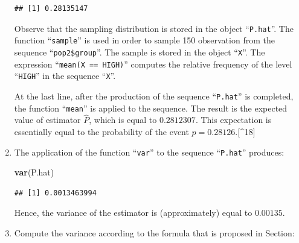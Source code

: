 \documentclass[]{krantz}
\makeatletter
\newenvironment{Shaded}{\begin{snugshade}}{\end{snugshade}}
\newcommand{\KeywordTok}[1]{\textcolor[rgb]{0.13,0.29,0.53}{\textbf{#1}}}
\newcommand{\DecValTok}[1]{\textcolor[rgb]{0.00,0.00,0.81}{#1}}
\newcommand{\StringTok}[1]{\textcolor[rgb]{0.31,0.60,0.02}{#1}}
\newcommand{\ControlFlowTok}[1]{\textcolor[rgb]{0.13,0.29,0.53}{\textbf{#1}}}
\newcommand{\OperatorTok}[1]{\textcolor[rgb]{0.81,0.36,0.00}{\textbf{#1}}}
\newcommand{\NormalTok}[1]{#1}
\newenvironment{kframe}{%
\medskip{}
\setlength{\fboxsep}{.8em}
 \def\at@end@of@kframe{}%
 \ifinner\ifhmode%
  \def\at@end@of@kframe{\end{minipage}}%
  \begin{minipage}{\columnwidth}%
 \fi\fi%
 \def\FrameCommand##1{\hskip\@totalleftmargin \hskip-\fboxsep
 \colorbox{shadecolor}{##1}\hskip-\fboxsep
     \hskip-\linewidth \hskip-\@totalleftmargin \hskip\columnwidth}%
 \MakeFramed {\advance\hsize-\width
   \@totalleftmargin\z@ \linewidth\hsize
   \@setminipage}}%
 {\par\unskip\endMakeFramed%
 \at@end@of@kframe}
\renewenvironment{Shaded}{\begin{kframe}}{\end{kframe}}
\theoremstyle{definition}
\theoremstyle{definition}
\theoremstyle{definition}
\theoremstyle{remark}
\makeatother
\begin{document}
\begin{enumerate}
\begin{Shaded}
\end{Shaded}

\begin{verbatim}
## [1] 0.28135147
\end{verbatim}

  Observe that the sampling distribution is stored in the object
  ``\texttt{P.hat}''. The function ``\texttt{sample}'' is used in order
  to sample 150 observation from the sequence ``\texttt{pop2\$group}''.
  The sample is stored in the object ``\texttt{X}''. The expression
  ``\texttt{mean(X\ ==\ HIGH)}'' computes the relative frequency of the
  level ``\texttt{HIGH}'' in the sequence ``\texttt{X}''.

  At the last line, after the production of the sequence
  ``\texttt{P.hat}'' is completed, the function ``\texttt{mean}'' is
  applied to the sequence. The result is the expected value of estimator
  \(\hat P\), which is equal to \(0.2812307\). This expectation is
  essentially equal to the probability of the event
  \(p = 0.28126\).{[}\^{}18{]}
\item
  The application of the function ``\texttt{var}'' to the sequence
  ``\texttt{P.hat}'' produces:

\begin{Shaded}
\begin{Highlighting}[]
\KeywordTok{var}\NormalTok{(P.hat)}
\end{Highlighting}
\end{Shaded}

\begin{verbatim}
## [1] 0.0013463994
\end{verbatim}

  Hence, the variance of the estimator is (approximately) equal to
  \(0.00135\).
\item
  Compute the variance according to the formula that is proposed in
  Section:


\end{enumerate}
\end{document}
